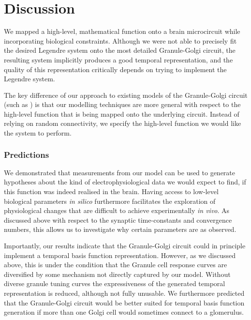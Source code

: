 
\section{Discussion}

We mapped a high-level, mathematical function onto a brain microcircuit while incorporating biological constraints.
Although we were not able to precisely fit the desired Legendre system onto the most detailed Granule-Golgi circuit, the resulting system implicitly produces a good temporal representation, and the quality of this representation critically depends on trying to implement the Legendre system.

The key difference of our approach to existing models of the Granule-Golgi circuit (such as \cite{rossert2015edge}) is that our modelling techniques are more general with respect to the high-level function that is being mapped onto the underlying circuit.
Instead of relying on random connectivity, we specify the high-level function we would like the system to perform.

\subsubsection{Predictions}
We demonstrated that measurements from our model can be used to generate hypotheses about the kind of electrophysiological data we would expect to find, if this function was indeed realised in the brain.
Having access to low-level biological parameters \emph{in silico} furthermore facilitates the exploration of physiological changes that are difficult to achieve experimentally \emph{in vivo}.
As discussed above with respect to the synaptic time-constants and convergence numbers, this allows us to investigate why certain parameters are as observed.

Importantly, our results indicate that the Granule-Golgi circuit could in principle implement a temporal basis function representation.
However, as we discussed above, this is under the condition that the Granule cell response curves are diversified by some mechanism not directly captured by our model.
Without diverse granule tuning curves the expressiveness of the generated temporal representation is reduced, although not fully unusable.
We furthermore predicted that the Granule-Golgi circuit would be better suited for temporal basis function generation if more than one Golgi cell would sometimes connect to a glomerulus.

